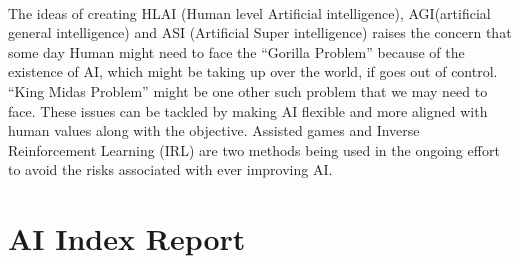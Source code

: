 \documentclass{article}
\begin{document}
\paragraph{}
The ideas of creating HLAI (Human level Artificial intelligence), AGI(artificial general intelligence) and ASI (Artificial Super intelligence) raises the concern that some day Human might need to face the “Gorilla Problem” because of the existence of AI, which might be taking up over the world, if goes out of control.
“King Midas Problem” might be one other such problem that we may need to face.
These issues can be tackled by making AI flexible and more aligned with human values along with the objective.
Assisted games and Inverse Reinforcement Learning (IRL) are two methods being used in the ongoing effort to avoid the risks associated with ever improving AI.



\section{AI Index Report} \cite{haireport}
\end{document}
